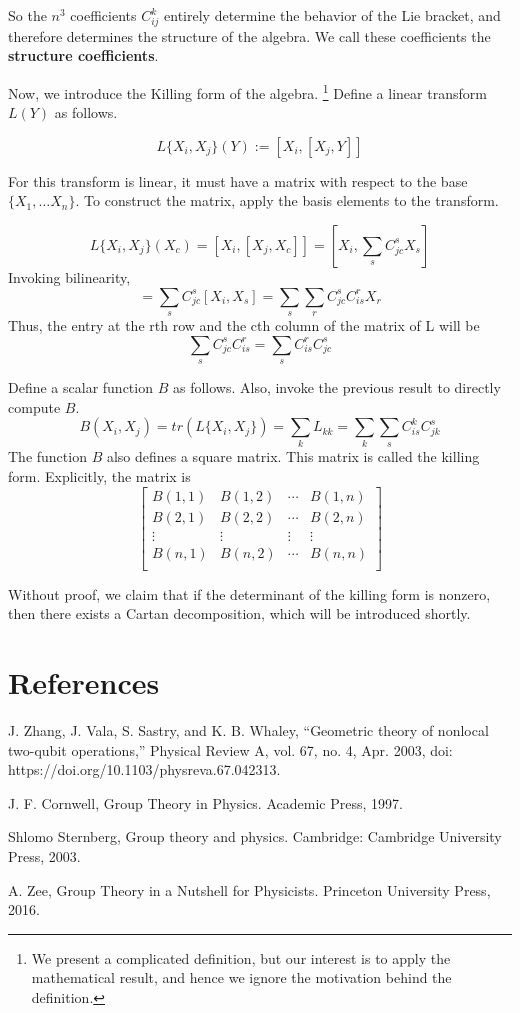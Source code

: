 \documentclass{article}
\begin{document}
So the $n^3$ coefficients $C_{ij}^k$ entirely determine the behavior 
of the Lie bracket, and therefore determines the structure of the algebra. 
We call these coefficients the \textbf{structure coefficients}. 

Now, we introduce the Killing form of the algebra. 
\footnote{We present a complicated definition, 
but our interest is to apply the mathematical result, 
and hence we ignore the motivation behind the definition. }
Define a linear transform $L(Y)$ as follows. 

\[
    L\{X_i, X_j\}(Y) := [X_i, [X_j, Y]]
\]

For this transform is linear, it must have a matrix with respect to 
the base $\{X_1, \dots X_n\}$. To construct the matrix, apply 
the basis elements to the transform. 

\[
    L\{X_i, X_j\}(X_c) =  [X_i, [X_j, X_c]] 
    = \left[X_i, \sum_{s} C_{jc}^s X_s\right]
\]
Invoking bilinearity, 
\[
    = \sum_s C_{jc}^s[X_i, X_s]
    = \sum_s \sum _r C_{jc}^s C_{is}^r X_r
\]
Thus, the entry at the rth row and the cth column of the matrix of L 
will be 
\[
    \sum_s C_{jc}^s C_{is}^r  =  \sum_s C_{is}^r C_{jc}^s
\]

Define a scalar function $B$ as follows. Also, invoke the previous 
result to directly compute $B$. 
\[
    B(X_i, X_j) = tr(L\{X_i, X_j\}) = \sum_k L_{kk} = 
    \sum_k \sum_s C_{is}^k C_{jk}^s
\]
The function $B$ also defines a square matrix. This matrix is called 
the killing form. Explicitly, the matrix is
\[
    \begin{bmatrix}
        B(1, 1) &  B(1, 2) & \cdots & B(1, n)\\
        B(2, 1) &  B(2, 2) & \cdots & B(2, n)\\
        \vdots & \vdots & \vdots & \vdots \\
        B(n, 1) &  B(n, 2) & \cdots & B(n, n)\\
    \end{bmatrix}
\]

Without proof, we claim that if the determinant of the killing 
form is nonzero, then there exists a Cartan decomposition, 
which will be introduced shortly. 

\newpage

\section{References}
\begin{enumerate}[ {[}1{]} ]
\item J. Zhang, J. Vala, S. Sastry, and K. B. Whaley, “Geometric theory of nonlocal two-qubit operations,” Physical Review A, vol. 67, no. 4, Apr. 2003, doi: https://doi.org/10.1103/physreva.67.042313.

\item J. F. Cornwell, Group Theory in Physics. Academic Press, 1997.

\item Shlomo Sternberg, Group theory and physics. Cambridge: Cambridge University Press, 2003.

\item A. Zee, Group Theory in a Nutshell for Physicists. Princeton University Press, 2016.
‌
\end{enumerate}
\end{document}
